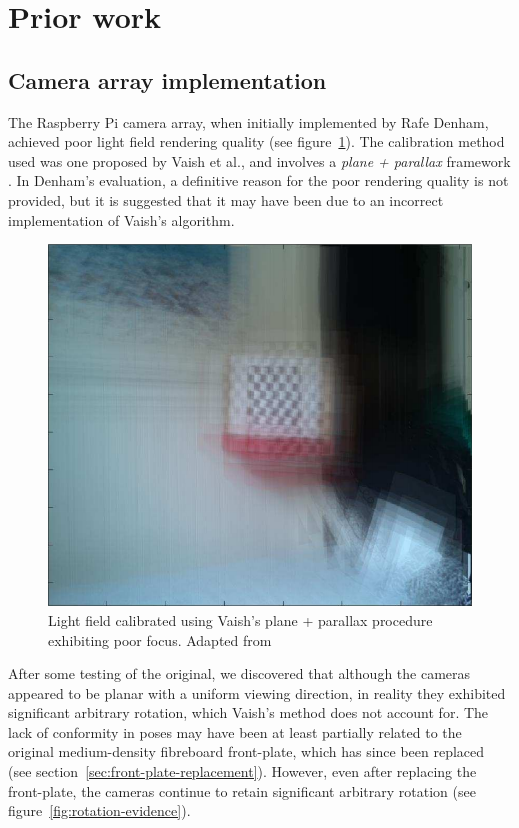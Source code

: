 \documentclass[../main.tex]{subfiles}
\begin{document}
\section{Prior work}
\subsection{Camera array implementation}
The Raspberry Pi camera array, when initially implemented by Rafe Denham, achieved poor light field rendering quality \cite{denhamRaspberry} (see figure~\ref{fig:sum-squeeze-calibrated}). The calibration method used was one proposed by Vaish et al., and involves a \emph{plane + parallax} framework \cite{vaish2004using}. In Denham's evaluation, a definitive reason for the poor rendering quality is not provided, but it is suggested that it may have been due to an incorrect implementation of Vaish's algorithm.

\begin{figure}[H]
    \centering
    \includegraphics[width=0.85\linewidth]{images/sum-squeeze-rendering-calibrated}
    \caption{Light field calibrated using Vaish's plane + parallax procedure exhibiting poor focus. Adapted from \protect{}}
    \label{fig:sum-squeeze-calibrated}
\end{figure}

After some testing of the original, we discovered that although the cameras appeared to be planar with a uniform viewing direction, in reality they exhibited significant arbitrary rotation, which Vaish's method does not account for. The lack of conformity in poses may have been at least partially related to the original medium-density fibreboard front-plate, which has since been replaced (see section~\ref{sec:front-plate-replacement}). However, even after replacing the front-plate, the cameras continue to retain significant arbitrary rotation (see figure~\ref{fig:rotation-evidence}).
\end{document}
